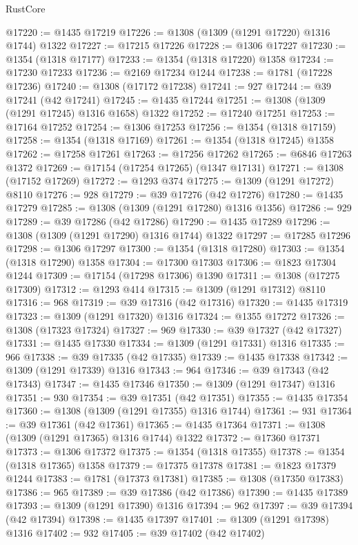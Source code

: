 \begin{lexlean}{RustCore}
\begin{coremodule}
@17220 := @1435 @17219
@17226 := @1308 (@1309 (@1291 @17220) @1316 @1744) @1322
@17227 := @17215 @17226
@17228 := @1306 @17227
@17230 := @1354 (@1318 @17177)
@17233 := @1354 (@1318 @17220) @1358
@17234 := @17230 @17233
@17236 := @2169 @17234 @1244
@17238 := @1781 (@17228 @17236)
@17240 := @1308 (@17172 @17238)
@17241 := 927
@17244 := @39 @17241 (@42 @17241)
@17245 := @1435 @17244
@17251 := @1308 (@1309 (@1291 @17245) @1316 @1658) @1322
@17252 := @17240 @17251
@17253 := @17164 @17252
@17254 := @1306 @17253
@17256 := @1354 (@1318 @17159)
@17258 := @1354 (@1318 @17169)
@17261 := @1354 (@1318 @17245) @1358
@17262 := @17258 @17261
@17263 := @17256 @17262
@17265 := @6846 @17263 @1372
@17269 := @17154 (@17254 @17265) (@1347 @17131)
@17271 := @1308 (@17152 @17269)
@17272 := @1293 @374
@17275 := @1309 (@1291 @17272) @8110
@17276 := 928
@17279 := @39 @17276 (@42 @17276)
@17280 := @1435 @17279
@17285 := @1308 (@1309 (@1291 @17280) @1316 @1356)
@17286 := 929
@17289 := @39 @17286 (@42 @17286)
@17290 := @1435 @17289
@17296 := @1308 (@1309 (@1291 @17290) @1316 @1744) @1322
@17297 := @17285 @17296
@17298 := @1306 @17297
@17300 := @1354 (@1318 @17280)
@17303 := @1354 (@1318 @17290) @1358
@17304 := @17300 @17303
@17306 := @1823 @17304 @1244
@17309 := @17154 (@17298 @17306) @1390
@17311 := @1308 (@17275 @17309)
@17312 := @1293 @414
@17315 := @1309 (@1291 @17312) @8110
@17316 := 968
@17319 := @39 @17316 (@42 @17316)
@17320 := @1435 @17319
@17323 := @1309 (@1291 @17320) @1316
@17324 := @1355 @17272
@17326 := @1308 (@17323 @17324)
@17327 := 969
@17330 := @39 @17327 (@42 @17327)
@17331 := @1435 @17330
@17334 := @1309 (@1291 @17331) @1316
@17335 := 966
@17338 := @39 @17335 (@42 @17335)
@17339 := @1435 @17338
@17342 := @1309 (@1291 @17339) @1316
@17343 := 964
@17346 := @39 @17343 (@42 @17343)
@17347 := @1435 @17346
@17350 := @1309 (@1291 @17347) @1316
@17351 := 930
@17354 := @39 @17351 (@42 @17351)
@17355 := @1435 @17354
@17360 := @1308 (@1309 (@1291 @17355) @1316 @1744)
@17361 := 931
@17364 := @39 @17361 (@42 @17361)
@17365 := @1435 @17364
@17371 := @1308 (@1309 (@1291 @17365) @1316 @1744) @1322
@17372 := @17360 @17371
@17373 := @1306 @17372
@17375 := @1354 (@1318 @17355)
@17378 := @1354 (@1318 @17365) @1358
@17379 := @17375 @17378
@17381 := @1823 @17379 @1244
@17383 := @1781 (@17373 @17381)
@17385 := @1308 (@17350 @17383)
@17386 := 965
@17389 := @39 @17386 (@42 @17386)
@17390 := @1435 @17389
@17393 := @1309 (@1291 @17390) @1316
@17394 := 962
@17397 := @39 @17394 (@42 @17394)
@17398 := @1435 @17397
@17401 := @1309 (@1291 @17398) @1316
@17402 := 932
@17405 := @39 @17402 (@42 @17402)

\end{coremodule}
\end{lexlean}
